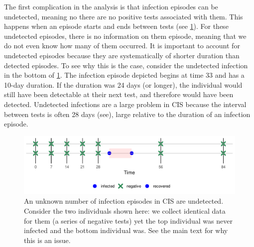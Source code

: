 \documentclass[thesis.tex]{subfiles}
\begin{document}
The first complication in the analysis is that infection episodes can be undetected, meaning no there are no positive tests associated with them.
This happens when an episode starts and ends between tests (see \cref{perf-test:fig:truncation}).
For these undetected episodes, there is no information on them episode, meaning that we do not even know how many of them occurred.
It is important to account for undetected episodes because they are systematically of shorter duration than detected episodes.
To see why this is the case, consider the undetected infection in the bottom of \cref{perf-test:fig:truncation}.
The infection episode depicted begins at time 33 and has a 10-day duration.
If the duration was 24 days (or longer), the individual would still have been detectable at their next test, and therefore would have been detected.
Undetected infections are a large problem in CIS because the interval between tests is often 28 days (see), large relative to the duration of an infection episode.
\begin{figure}
  \centering \includegraphics{cis-perfect-testing/truncation}
  \caption[Undetected episodes in CIS data]{An unknown number of infection episodes in CIS are undetected. Consider the two individuals shown here: we collect identical data for them (a series of negative tests) yet the top individual was never infected and the bottom individual was. See the main text for why this is an issue. \label{perf-test:fig:truncation}}
\end{figure}
\end{document}

